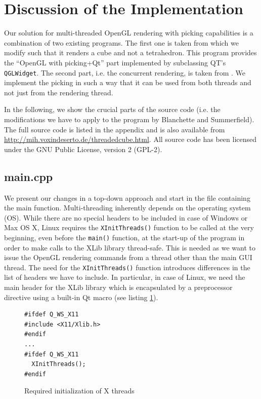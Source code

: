 \documentclass[jou,noapacite]{apa}
\begin{document}
\section{Discussion of the Implementation}

Our solution for multi-threaded OpenGL rendering with picking capabilities is a
combination of two existing programs.
%
The first one is taken from \cite[chapter 8]{Blanchette2008} which we modify
such that it renders a cube and not a tetrahedron. This program provides the
``OpenGL with picking+Qt'' part implemented 
by subclassing QT's \lstinline|QGLWidget|.
%
The second part, i.e. the concurrent rendering, is taken from \cite{glimpse3d}.
%
We implement the picking in such a way that it can be used from both threads
and not just from the rendering thread.

In the following, we show the crucial parts of the source code (i.e. the
modifications we have to apply to the program by Blanchette and Summerfield).
%
The full source code is listed in the appendix and is also available from
\url{http://mih.voxindeserto.de/threadedcube.html}. All source code has been
licensed under the GNU Public License, version 2 (GPL-2).



\subsection{main.cpp}

We present our changes in a top-down approach and start in the file containing
the main function.
%
Multi-threading inherently depends on the operating system (OS).
%
While there are no special headers to be included in case of {\sf Windows} or
{\sf Max OS X}, {\sf Linux} requires the \lstinline|XInitThreads()| function to
be called at the very beginning, even before the \lstinline|main()| function, at
the start-up of the program in order to make calls to the  {\sf XLib} library
thread-safe.
%
This is needed as we want to issue the OpenGL rendering commands from a thread
other than the main GUI thread.
%
The need for the \lstinline|XInitThreads()| function introduces differences in the
list of headers we have to include.
%
In particular, in case of Linux, we need the main header for the {\sf XLib}
library which is encapsulated by a preprocessor directive using a built-in Qt
macro (see listing \ref{lst:initthreads}).
%
\begin{figure}[h]
\begin{lstlisting}[basicstyle=\scriptsize]
#ifdef Q_WS_X11
#include <X11/Xlib.h>
#endif
...
#ifdef Q_WS_X11
  XInitThreads();
#endif
\end{lstlisting}
\caption{Required initialization of X threads}
\label{lst:initthreads}
\end{figure}
\end{document}
